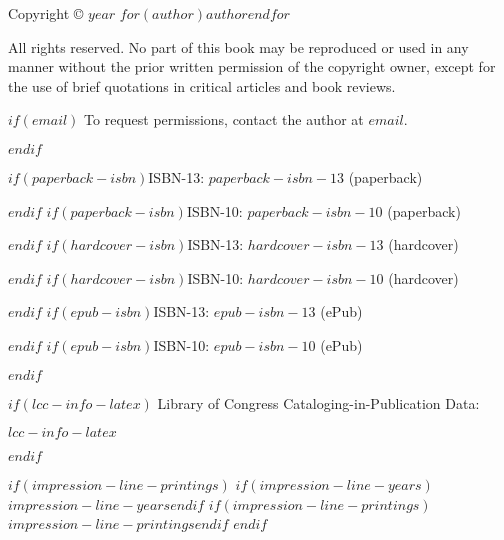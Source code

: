 \vspace*{\fill}

\begin{singlespacing}

\noindent Copyright © $year$ $for(author)$$author$$endfor$ \par

\vspace{0.4cm}

\noindent All rights reserved. No part of this book may be reproduced 
or used in any manner without the prior written permission of the copyright owner, 
except for the use of brief quotations in critical articles and book reviews. \par

\vspace{0.4cm}

$if(email)$
\noindent To request permissions, contact the author at $email$. \par
\vspace{0.4cm}
$endif$

  $if(paperback-isbn)$\noindent ISBN-13: {$paperback-isbn-13$} (paperback) \par $endif$
  $if(paperback-isbn)$\noindent ISBN-10: {$paperback-isbn-10$} (paperback) \par $endif$
  $if(hardcover-isbn)$\noindent ISBN-13: {$hardcover-isbn-13$} (hardcover) \par $endif$
  $if(hardcover-isbn)$\noindent ISBN-10: {$hardcover-isbn-10$} (hardcover) \par $endif$
  $if(epub-isbn)$\noindent ISBN-13: {$epub-isbn-13$} (ePub) \par $endif$
  $if(epub-isbn)$\noindent ISBN-10: {$epub-isbn-10$} (ePub) \par $endif$

\vspace{0.4cm}

$if(lcc-info-latex)$
\noindent Library of Congress Cataloging-in-Publication Data: \par
$lcc-info-latex$ \par
\vspace{0.4cm}
$endif$

$if(impression-line-printings)$
$if(impression-line-years)$\noindent $impression-line-years$\hspace{.5cm}$endif$
$if(impression-line-printings)$\noindent $impression-line-printings$$endif$
\vspace{0.4cm}
$endif$


\end{singlespacing}
